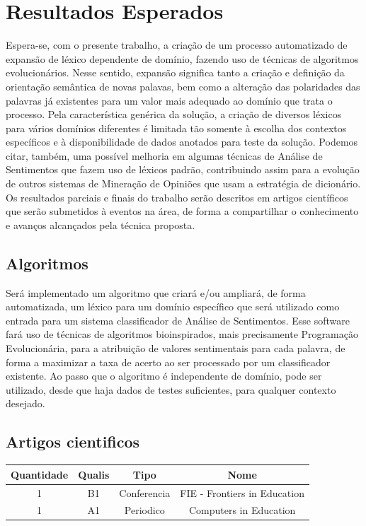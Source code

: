 \documentclass[a4paper,11pt]{article}
\begin{document}
\section{Resultados Esperados}
Espera-se, com o presente trabalho, a criação de um processo automatizado de expansão de léxico dependente de domínio, fazendo uso de técnicas de algoritmos evolucionários. Nesse sentido, expansão significa tanto a criação e definição da orientação semântica de novas palavas, bem como a alteração das polaridades das palavras já existentes para um valor mais adequado ao domínio que trata o processo.
Pela característica genérica da solução, a criação de diversos léxicos para vários domínios diferentes é limitada tão somente à escolha dos contextos específicos e à disponibilidade de dados anotados para teste da solução.
Podemos citar, também, uma possível melhoria em algumas técnicas de Análise de Sentimentos que fazem uso de léxicos padrão, contribuindo assim para a evolução de outros sistemas de Mineração de Opiniões que usam a estratégia de dicionário.
Os resultados parciais e finais do trabalho serão descritos em artigos científicos que serão submetidos à eventos na área, de forma a compartilhar o conhecimento e avanços alcançados pela técnica proposta.

\subsection{Algoritmos} %
Será implementado um algoritmo que criará e/ou ampliará, de forma automatizada, um léxico para um domínio específico que será utilizado como entrada para um sistema classificador de Análise de Sentimentos.
Esse software fará uso de técnicas de algoritmos bioinspirados, mais precisamente Programação Evolucionária, para a atribuição de valores sentimentais para cada palavra, de forma a maximizar a taxa de acerto ao ser processado por um classificador existente.
Ao passo que o algoritmo é independente de domínio, pode ser utilizado, desde que haja dados de testes suficientes, para qualquer contexto desejado.

\subsection{Artigos cientificos}
\begin{tabular}{| c | c | c | c |}
\hline
\textbf{Quantidade} & \textbf{Qualis} & \textbf{Tipo} & \textbf{Nome} \\
\hline
1 & B1 & Conferencia & FIE - Frontiers in Education \\
\hline
1 & A1 & Periodico & Computers in Education \\
\hline
\end{tabular}
\end{document}
